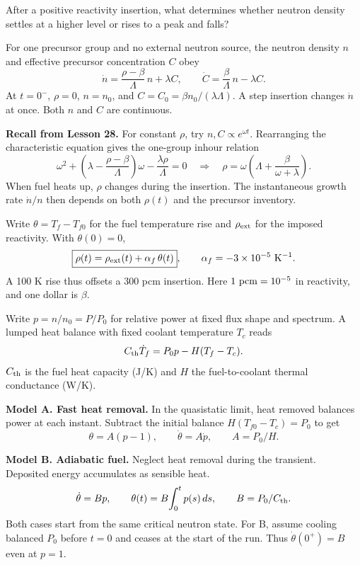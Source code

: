 \documentclass[compact]{ne630handout}
\begin{document}
{After a positive reactivity insertion, what determines whether neutron density settles at a higher level or rises to a peak and falls?}

\begin{handoutflow}

For one precursor group and no external neutron source, the neutron density $n$ and effective precursor concentration $C$ obey
$$
  \dot n=\frac{\rho-\beta}{\Lambda}\,n+\lambda C,
  \qquad \dot C=\frac{\beta}{\Lambda}\,n-\lambda C .
$$
At $t=0^-$, $\rho=0$, $n=n_0$, and $C=C_0=\beta n_0/(\lambda\Lambda)$.
A step insertion changes $\dot n$ at once. Both $n$ and $C$ are continuous.

\textbf{Recall from Lesson 28.} For constant $\rho$, try $n,C\propto e^{\omega t}$. Rearranging the characteristic equation gives the one-group inhour relation
$$
\omega^2+\left(\lambda-\frac{\rho-\beta}{\Lambda}\right)\omega
  -\frac{\lambda\rho}{\Lambda}=0
\quad\Longrightarrow\quad
\rho=\omega\!\left(\Lambda+\frac{\beta}{\omega+\lambda}\right).
$$
When fuel heats up, $\rho$ changes during the insertion. The instantaneous growth rate $\dot n/n$ then depends on both $\rho(t)$ and the precursor inventory.


Write $\theta=T_f-T_{f0}$ for the fuel temperature rise and $\rho_{\rm ext}$ for the imposed reactivity. With $\theta(0)=0$,
$$
  \boxed{\rho(t)=\rho_{\rm ext}(t)+\alpha_f\,\theta(t)},
  \qquad \alpha_f=-3\times10^{-5}\ {\rm K}^{-1}.
$$
A 100 K rise thus offsets a 300 pcm insertion. Here $1\ {\rm pcm}=10^{-5}$ in reactivity, and one dollar is $\beta$.

Write $p=n/n_0=P/P_0$ for relative power at fixed flux shape and spectrum. A lumped heat balance with fixed coolant temperature $T_c$ reads
$$
 C_{\rm th}\dot T_f=P_0 p-H(T_f-T_c).
$$
$C_{\rm th}$ is the fuel heat capacity (J/K) and $H$ the fuel-to-coolant thermal conductance (W/K).

\textbf{Model A. Fast heat removal.}
In the quasistatic limit, heat removed balances power at each instant. Subtract the initial balance $H(T_{f0}-T_c)=P_0$ to get
$$
 \theta=A(p-1),\qquad \dot\theta=A\dot p,\qquad A=P_0/H.
$$

\textbf{Model B. Adiabatic fuel.}
Neglect heat removal during the transient. Deposited energy accumulates as sensible heat.
$$
 \dot\theta=Bp,\qquad \theta(t)=B\!\int_0^t p(s)\,ds,
 \qquad B=P_0/C_{\rm th}.
$$
Both cases start from the same critical neutron state. For B, assume cooling balanced $P_0$ before $t=0$ and ceases at the start of the run. Thus $\dot\theta(0^+)=B$ even at $p=1$.


\end{handoutflow}
\end{document}
